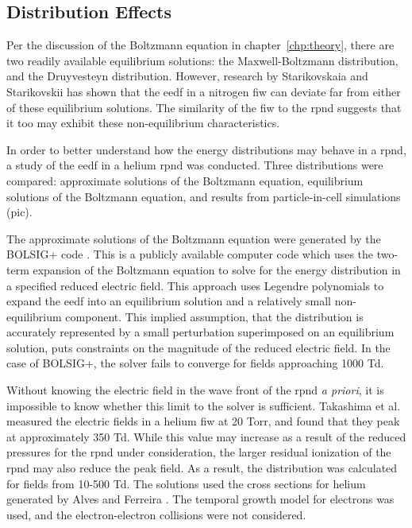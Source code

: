 \subsection{Distribution Effects}

Per the discussion of the Boltzmann equation in chapter~\ref{chp:theory}, there
are two readily available equilibrium solutions: the Maxwell-Boltzmann
distribution, and the Druyvesteyn distribution. However, research by
Starikovskaia and Starikovskii \cite{Starikovskaia2001} has shown that the
\acs{eedf} in a nitrogen \acs{fiw} can deviate far from either of these
equilibrium solutions. The similarity of the \acs{fiw} to the \acs{rpnd}
suggests that it too may exhibit these non-equilibrium characteristics.

In order to better understand how the energy distributions may behave in a
\acs{rpnd}, a study of the \acs{eedf} in a helium \acs{rpnd} was conducted.
Three distributions were compared: approximate solutions of the Boltzmann
equation, equilibrium solutions of the Boltzmann equation, and results from
particle-in-cell simulations (\acs{pic}).

The approximate solutions of the Boltzmann equation were generated by the
BOLSIG+ code \cite{Hagelaar2005}. This is a publicly available computer code
which uses the two-term expansion of the Boltzmann equation to solve for the
energy distribution in a specified reduced electric field. This approach uses
Legendre polynomials to expand the \acs{eedf} into an equilibrium solution and a
relatively small non-equilibrium component. This implied assumption, that the
distribution is accurately represented by a small perturbation superimposed on
an equilibrium solution, puts constraints on the magnitude of the reduced
electric field. In the case of BOLSIG+, the solver fails to converge for fields
approaching 1000 Td.

Without knowing the electric field in the wave front of the \acs{rpnd} \emph{a
priori}, it is impossible to know whether this limit to the solver is
sufficient. Takashima et al. \cite{Takashima2011} measured the electric fields
in a helium \acs{fiw} at 20 Torr, and found that they peak at approximately 350
Td. While this value may increase as a result of the reduced pressures for the
\acs{rpnd} under consideration, the larger residual ionization of the \acs{rpnd}
may also reduce the peak field. As a result, the distribution was calculated for
fields from 10-500 Td. The solutions used the cross sections for helium
generated by Alves and Ferreira \cite{Alves2013}. The temporal growth model for
electrons was used, and the electron-electron collisions were not considered.

